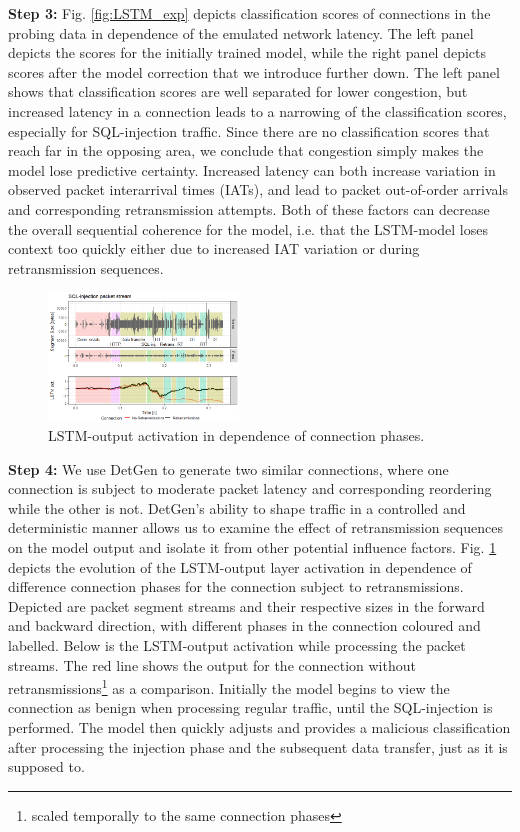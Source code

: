 \documentclass[10pt,conference]{IEEEtran}
\begin{document}
\textbf{Step 3:} Fig. \ref{fig:LSTM_exp} depicts classification scores of connections in the probing data in dependence of the emulated network latency. The left panel depicts the scores for the initially trained model, while the right panel depicts scores after the model correction that we introduce further down. 
The left panel shows that classification scores are well separated for lower congestion, but increased latency in a connection leads to a narrowing of the classification scores, especially for SQL-injection traffic. Since there are no classification scores that reach far in the opposing area, we conclude that congestion simply makes the model lose predictive certainty. 
Increased latency can both increase variation in observed packet interarrival times (IATs), and lead to packet out-of-order arrivals and corresponding retransmission attempts. Both of these factors can decrease the overall sequential coherence for the model, i.e. that the LSTM-model loses context too quickly either due to increased IAT variation or during retransmission sequences. 


\begin{figure}
\centering
\includegraphics[width=0.45\textwidth]{images/LSTM_activation_new.png}
\caption{LSTM-output activation in dependence of connection phases.}\label{fig:LSTM_act}
\end{figure}

\textbf{Step 4:} We use DetGen to generate two similar connections, where one connection is subject to moderate packet latency and corresponding reordering while the other is not. DetGen's ability to shape traffic in a controlled and deterministic manner allows us to examine the effect of retransmission sequences on the model output and isolate it from other potential influence factors. 
Fig. \ref{fig:LSTM_act} depicts the evolution of the LSTM-output layer activation in dependence of difference connection phases for the connection subject to retransmissions. Depicted are packet segment streams and their respective sizes in the forward and backward direction, with different phases in the connection coloured and labelled. Below is the LSTM-output activation while processing the packet streams. The red line shows the output for the connection without retransmissions\footnote{scaled temporally to the same connection phases} as a comparison.
Initially the model begins to view the connection as benign when processing regular traffic, until the SQL-injection is performed. The model then quickly adjusts and provides a malicious classification after processing the injection phase and the subsequent data transfer, just as it is supposed to. 
\end{document}
